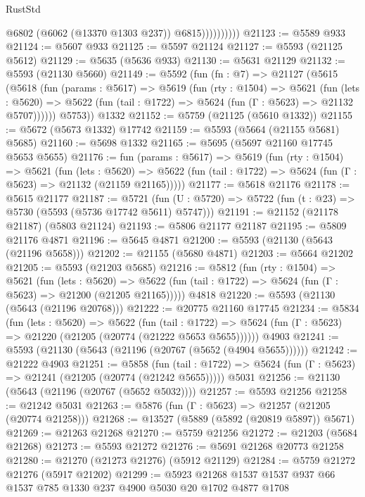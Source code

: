 \begin{lexlean}{RustStd}
\begin{coremodule}
                        @6802
                        (@6062 (@13370 @1303 @237))
                        @6815))))))))))
@21123 := @5589 @933
@21124 := @5607 @933
@21125 := @5597 @21124
@21127 := @5593 (@21125 @5612)
@21129 := @5635 (@5636 @933)
@21130 := @5631 @21129
@21132 := @5593 (@21130 @5660)
@21149 := @5592
    (fun (fn : @7) =>
    @21127
      (@5615
        (@5618
          (fun (params : @5617) =>
          @5619
            (fun (rty : @1504) =>
            @5621
              (fun (lets : @5620) =>
              @5622 (fun (tail : @1722) => @5624 (fun (Γ : @5623) => @21132 @5707))))))
        @5753))
    @1332
@21152 := @5759 (@21125 (@5610 @1332))
@21155 := @5672 (@5673 @1332) @17742
@21159 := @5593 (@5664 (@21155 @5681) @5685)
@21160 := @5698 @1332
@21165 := @5695 (@5697 @21160 @17745 @5653 @5655)
@21176 := fun (params : @5617) =>
  @5619
    (fun (rty : @1504) =>
    @5621
      (fun (lets : @5620) =>
      @5622 (fun (tail : @1722) => @5624 (fun (Γ : @5623) => @21132 (@21159 @21165)))))
@21177 := @5618 @21176
@21178 := @5615 @21177
@21187 := @5721
    (fun (U : @5720) => @5722 (fun (t : @23) => @5730 (@5593 (@5736 @17742 @5611) @5747)))
@21191 := @21152 (@21178 @21187) (@5803 @21124)
@21193 := @5806 @21177 @21187
@21195 := @5809 @21176 @4871
@21196 := @5645 @4871
@21200 := @5593 (@21130 (@5643 (@21196 @5658)))
@21202 := @21155 (@5680 @4871)
@21203 := @5664 @21202
@21205 := @5593 (@21203 @5685)
@21216 := @5812
    (fun (rty : @1504) =>
    @5621
      (fun (lets : @5620) =>
      @5622 (fun (tail : @1722) => @5624 (fun (Γ : @5623) => @21200 (@21205 @21165)))))
    @4818
@21220 := @5593 (@21130 (@5643 (@21196 @20768)))
@21222 := @20775 @21160 @17745
@21234 := @5834
    (fun (lets : @5620) =>
    @5622
      (fun (tail : @1722) =>
      @5624 (fun (Γ : @5623) => @21220 (@21205 (@20774 (@21222 @5653 @5655))))))
    @4903
@21241 := @5593 (@21130 (@5643 (@21196 (@20767 (@5652 (@4904 @5655))))))
@21242 := @21222 @4903
@21251 := @5858
    (fun (tail : @1722) => @5624 (fun (Γ : @5623) => @21241 (@21205 (@20774 (@21242 @5655)))))
    @5031
@21256 := @21130 (@5643 (@21196 (@20767 (@5652 @5032))))
@21257 := @5593 @21256
@21258 := @21242 @5031
@21263 := @5876 (fun (Γ : @5623) => @21257 (@21205 (@20774 @21258)))
@21268 := @13527 (@5889 (@5892 (@20819 @5897)) @5671)
@21269 := @21263 @21268
@21270 := @5759 @21256
@21272 := @21203 (@5684 @21268)
@21273 := @5593 @21272
@21276 := @5691 @21268 @20773 @21258
@21280 := @21270 (@21273 @21276) (@5912 @21129)
@21284 := @5759 @21272 @21276 (@5917 @21202)
@21299 := @5923 @21268 @1537 @1537 @937 @66 @1537 @785 @1330 @237 @4900 @5030 @20 @1702 @4877 @1708

\end{coremodule}
\end{lexlean}
